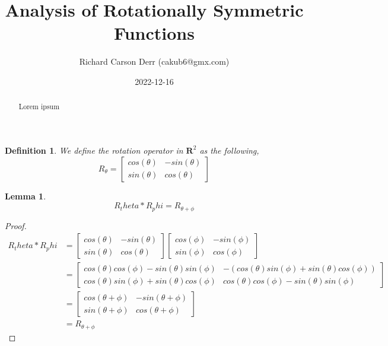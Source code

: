 \documentclass{article}
\title{Analysis of Rotationally Symmetric Functions}
\author{Richard Carson Derr (cakub6@gmx.com)}
\date{2022-12-16}
\newtheorem{definition}{Definition}
\newtheorem{lemma}{Lemma}
\begin{document}
\maketitle

\begin{abstract}
  Lorem ipsum
\end{abstract}

\begin{definition}\label{rotationoperator}
  We define the rotation operator in $\mathbf{R}^2$ as the following,
  \begin{equation}
    R_\theta
    =
    \begin{bmatrix}
      cos(\theta) & -sin(\theta) \\
      sin(\theta) & cos(\theta)
    \end{bmatrix}      
  \end{equation}
\end{definition}

\begin{lemma}
  \begin{equation}
    R_theta * R_phi = R_{\theta + \phi}
  \end{equation}
\end{lemma}

\begin{proof}
  \begin{equation}
    \begin{split}
      R_theta * R_phi
      &=
      \begin{bmatrix}
        cos(\theta) & -sin(\theta) \\
        sin(\theta) & cos(\theta)
      \end{bmatrix}
      \begin{bmatrix}
        cos(\phi) & -sin(\phi) \\
        sin(\phi) & cos(\phi)
      \end{bmatrix} \\
      &=
      \begin{bmatrix}
        cos(\theta)cos(\phi) - sin(\theta)sin(\phi) & -(cos(\theta)sin(\phi) + sin(\theta)cos(\phi)) \\
        cos(\theta)sin(\phi) + sin(\theta)cos(\phi) & cos(\theta)cos(\phi) - sin(\theta)sin(\phi)
      \end{bmatrix} \\
      &=
      \begin{bmatrix}
        cos(\theta + \phi) & -sin(\theta + \phi) \\
        sin(\theta + \phi) & cos(\theta + \phi)
      \end{bmatrix} \\
      &=
      R_{\theta + \phi}
    \end{split}
  \end{equation}
\end{proof}
\end{document}
